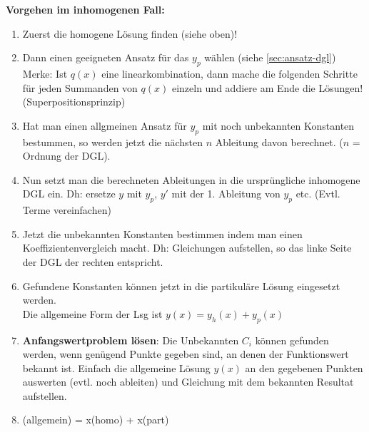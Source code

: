\textbf{\textbf{Vorgehen im inhomogenen Fall:}}
\begin{enumerate}[leftmargin=0.3cm]
	\item Zuerst die homogene Lösung finden (siehe oben)!

	\item Dann einen geeigneten Ansatz für das $y_p$ wählen (siehe \ref{sec:ansatz-dgl})\\
	Merke: Ist $q(x)$ eine linearkombination, dann mache die folgenden Schritte für jeden Summanden von $q(x)$ einzeln und addiere am Ende die Lösungen! (Superpositionsprinzip)

	\item Hat man einen allgmeinen Ansatz für $y_p$ mit noch unbekannten Konstanten bestummen, so werden jetzt die nächsten $n$ Ableitung davon berechnet. ($n$ = Ordnung der DGL). 

	\item Nun setzt man die berechneten Ableitungen in die ursprüngliche inhomogene DGL ein. Dh: ersetze $y$ mit $y_p$, $y'$ mit der 1. Ableitung von $y_p$ etc. (Evtl. Terme vereinfachen)

	\item Jetzt die unbekannten Konstanten bestimmen indem man einen Koeffizientenvergleich macht. Dh: Gleichungen aufstellen, so das linke Seite der DGL der rechten entspricht. 

	\item Gefundene Konstanten können jetzt in die partikuläre Lösung eingesetzt werden.\\
	Die allgemeine Form der Lsg ist $y(x) = y_h(x) + y_p(x)$

	\item \textbf{Anfangswertproblem lösen}: Die Unbekannten $C_i$ können gefunden werden, wenn genügend Punkte gegeben sind, an denen der Funktionswert bekannt ist. Einfach die allgemeine Lösung $y(x)$ an den gegebenen Punkten auswerten (evtl. noch ableiten) und Gleichung mit dem bekannten Resultat aufstellen.
	\item (allgemein) = x(homo) + x(part)
\end{enumerate}

